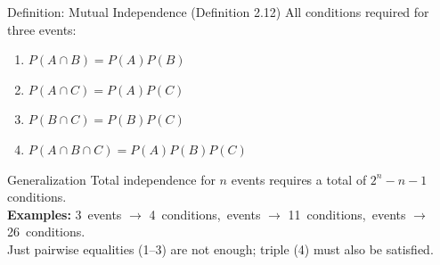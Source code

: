 \documentclass[light]{lutbeamer}
\begin{document}
\begin{frame}{Definition: Mutual Independence (Definition 2.12)}
    All conditions required for three events:
    \begin{enumerate}
        \item \(P(A\cap B)=P(A)P(B)\)
        \item \(P(A\cap C)=P(A)P(C)\)
        \item \(P(B\cap C)=P(B)P(C)\)
        \item \(P(A\cap B\cap C)=P(A)P(B)P(C)\)
    \end{enumerate}

    \begin{block}{Generalization}
        Total independence for $n$ events requires a total of $2^n - n - 1$ conditions.\\
        \textbf{Examples:} 3~events $\rightarrow$ 4~conditions,~events $\rightarrow$ 11~conditions,~events $\rightarrow$ 26~conditions.\\
        Just pairwise equalities (1--3) are not enough; triple (4) must also be satisfied.
    \end{block}
\end{frame}
\end{document}
